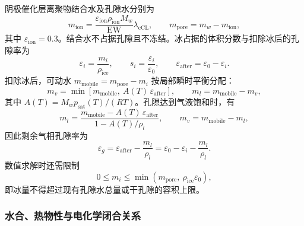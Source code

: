 \documentclass{gmcmthesis}
\begin{document}
阴极催化层离聚物结合水及孔隙水分别为
\begin{equation}
  m_{\mathrm{ion}}=\frac{\varepsilon_{\mathrm{ion}}\rho_{\mathrm{ion}}M_w}{\mathrm{EW}}\lambda_{\mathrm{cCL}},
  \qquad
  m_{\mathrm{pore}}=m_w-m_{\mathrm{ion}},
  \label{eq:mion}
\end{equation}
其中 $\varepsilon_{\mathrm{ion}}=0.3$。结合水不占据孔隙且不冻结。冰占据的体积分数与扣除冰后的孔隙率为
\begin{equation}
  \varepsilon_i=\frac{m_i}{\rho_{\mathrm{ice}}},
  \qquad
  s_i=\frac{\varepsilon_i}{\varepsilon_0},
  \qquad
  \varepsilon_{\mathrm{after}}=\varepsilon_0-\varepsilon_i.
  \label{eq:epsi}
\end{equation}
扣除冰后，可动水 $m_{\mathrm{mobile}}=m_{\mathrm{pore}}-m_i$ 按局部瞬时平衡分配：
\begin{equation}
  m_v=\min\!\left[m_{\mathrm{mobile}},~A(T)\,\varepsilon_{\mathrm{after}}\right],
  \qquad
  m_l=m_{\mathrm{mobile}}-m_v,
  \label{eq:vl}
\end{equation}
其中 $A(T)=M_w p_{\mathrm{sat}}(T)/(RT)$。孔隙达到气液饱和时，有
\begin{equation}
  m_l=\frac{m_{\mathrm{mobile}}-A(T)\,\varepsilon_{\mathrm{after}}}{1-A(T)/\rho_l},
  \qquad
  m_v=m_{\mathrm{mobile}}-m_l,
  \label{eq:mlsat}
\end{equation}
因此剩余气相孔隙率为
\begin{equation}
  \varepsilon_g=\varepsilon_{\mathrm{after}}-\frac{m_l}{\rho_l}
  =\varepsilon_0-\varepsilon_i-\frac{m_l}{\rho_l}.
  \label{eq:epsg}
\end{equation}
数值求解时还需限制
\begin{equation}
  0\le m_i\le \min\!\left(m_{\mathrm{pore}},~\rho_{\mathrm{ice}}\varepsilon_0\right),
  \label{eq:icelimit}
\end{equation}
即冰量不得超过现有孔隙水总量或干孔隙的容积上限。

\subsubsection{水合、热物性与电化学闭合关系}
\end{document}
